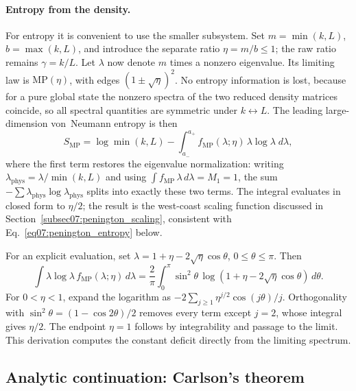 \documentclass[11pt,letterpaper]{article}
\theoremstyle{plain}
\theoremstyle{definition}
\theoremstyle{remark}
\begin{document}
\paragraph{Entropy from the density.}
For entropy it is convenient to use the smaller subsystem.  Set
$m=\min(k,L)$, $b=\max(k,L)$, and introduce the separate ratio
$\eta=m/b\leq1$; the raw ratio remains $\gamma=k/L$.
Let $\lambda$ now denote $m$ times a nonzero eigenvalue.  Its limiting law is
$\mathrm{MP}(\eta)$, with edges $(1\pm\sqrt\eta)^2$.  No entropy information
is lost, because
for a pure global state the nonzero spectra of the two reduced density
matrices coincide, so all spectral quantities are symmetric under
$k \leftrightarrow L$.  The leading large-dimension von~Neumann entropy is then
\begin{equation}
  S_{\mathrm{MP}}
  = \log\min(k,L)
  - \int_{a_-}^{a_+} f_{\mathrm{MP}}(\lambda;\eta)\,
    \lambda \log \lambda \; d\lambda,
  \label{eq07:entropy_integral}
\end{equation}
where the first term restores the eigenvalue normalization: writing
$\lambda_{\mathrm{phys}} = \lambda/\min(k,L)$ and using
$\int f_{\mathrm{MP}}\,\lambda\,d\lambda = M_1 = 1$, the sum
$-\sum \lambda_{\mathrm{phys}} \log \lambda_{\mathrm{phys}}$ splits
into exactly these two terms.  The integral evaluates in closed form to
$\eta/2$; the result is the west-coast scaling function discussed in
Section~\ref{subsec07:penington_scaling}, consistent with
Eq.~\eqref{eq07:penington_entropy} below.

For an explicit evaluation, set
$\lambda=1+\eta-2\sqrt\eta\cos\theta$, $0\leq\theta\leq\pi$.
Then
\begin{equation}
 \int\lambda\log\lambda\,f_{\mathrm{MP}}(\lambda;\eta)\,d\lambda
 =\frac2\pi\int_0^\pi\sin^2\theta\,
 \log(1+\eta-2\sqrt\eta\cos\theta)\,d\theta.
 \label{eq07:entropy_angle}
\end{equation}
For $0<\eta<1$, expand the logarithm as
$-2\sum_{j\geq1}\eta^{j/2}\cos(j\theta)/j$.
Orthogonality with $\sin^2\theta=(1-\cos2\theta)/2$ removes every term
except $j=2$, whose integral gives $\eta/2$.  The endpoint $\eta=1$
follows by integrability and passage to the limit.  This derivation computes
the constant deficit directly from the limiting spectrum.


\subsection{Analytic continuation: Carlson's theorem}
\label{subsec07:carlson}
\end{document}
